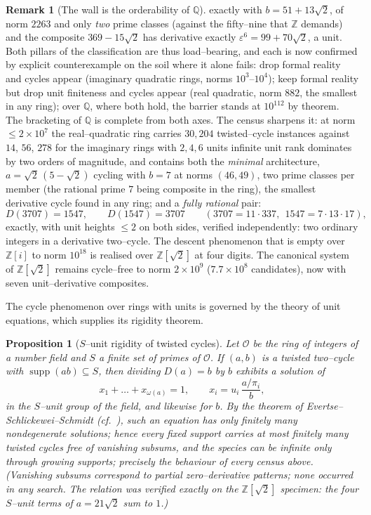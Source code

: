 \documentclass[11pt]{article}
\newtheorem{proposition}[theorem]{Proposition}
\theoremstyle{definition}
\newtheorem{remark}[theorem]{Remark}
\begin{document}
\begin{remark}[The wall is the orderability of $\mathbb{Q}$]
exactly with $b=51+13\sqrt2$, of norm $2263$ and only \emph{two} prime classes (against the
fifty--nine that $\mathbb{Z}$ demands) and the composite $369-15\sqrt2$ has derivative exactly
$\varepsilon^6=99+70\sqrt2$, a unit. Both pillars of the classification are thus load--bearing, and each
is now confirmed by explicit counterexample on the soil where it alone fails: drop formal reality and
cycles appear (imaginary quadratic rings, norms $10^3$--$10^4$); keep formal reality but drop unit
finiteness and cycles appear (real quadratic, norm $882$, the smallest in any ring); over $\mathbb{Q}$,
where both hold, the barrier stands at $10^{112}$ by theorem. The bracketing of $\mathbb{Q}$ is complete
from both axes. The census sharpens it: at norm $\le2\times10^7$ the real--quadratic ring carries
$30{,}204$ twisted--cycle instances against $14$, $56$, $278$ for the imaginary rings with $2,4,6$ units
infinite unit rank dominates by two orders of magnitude, and contains both the \emph{minimal}
architecture, $a=\sqrt2\,(5-\sqrt2)$ cycling with $b=7$ at norms $(46,49)$, two prime classes per member
(the rational prime $7$ being composite in the ring), the smallest derivative cycle found in any ring;
and a \emph{fully rational} pair:
\[ D(3707)=1547,\qquad D(1547)=3707\qquad(3707=11\cdot337,\ \ 1547=7\cdot13\cdot17), \]
exactly, with unit heights $\le2$ on both sides, verified independently: two ordinary integers in a
derivative two--cycle. The descent phenomenon that is empty over $\mathbb{Z}[i]$ to norm $10^{18}$ is
realised over $\mathbb{Z}[\sqrt2]$ at four digits. The canonical system of $\mathbb{Z}[\sqrt2]$ remains
cycle--free to norm $2\times10^9$ ($7.7\times10^8$ candidates), now with seven unit--derivative
composites.
\end{remark}

The cycle phenomenon over rings with units is governed by the theory of unit equations, which supplies
its rigidity theorem.

\begin{proposition}[$S$--unit rigidity of twisted cycles]\label{prop:sunit}
Let $\mathcal{O}$ be the ring of integers of a number field and $S$ a finite set of primes of
$\mathcal{O}$. If $(a,b)$ is a twisted two--cycle with $\operatorname{supp}(ab)\subseteq S$, then
dividing $D(a)=b$ by $b$ exhibits a solution of
\[ x_1+\dots+x_{\omega(a)}=1,\qquad x_i=u_i\,\frac{a/\pi_i}{b}, \]
in the $S$--unit group of the field, and likewise for $b$. By the theorem of
Evertse--Schlickewei--Schmidt \cite{ESS2002} (cf.\ \cite{Evertse1984}), such an equation has only
finitely many nondegenerate solutions; hence \emph{every fixed support carries at most finitely many
twisted cycles free of vanishing subsums}, and the species can be infinite only through growing
supports; precisely the behaviour of every census above. (Vanishing subsums correspond to partial
zero--derivative patterns; none occurred in any search. The relation was verified exactly on the
$\mathbb{Z}[\sqrt2]$ specimen: the four $S$--unit terms of $a=21\sqrt2$ sum to $1$.)
\end{proposition}
\end{document}
